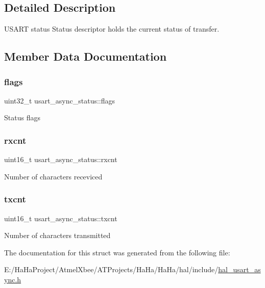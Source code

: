 \subsection{Detailed Description}
U\+S\+A\+RT status Status descriptor holds the current status of transfer. 

\subsection{Member Data Documentation}
\mbox{\label{structusart__async__status_a6d85ac04ed76a86bb9c49bb45a848d9a}} 
\subsubsection{\texorpdfstring{flags}{flags}}
{\footnotesize\ttfamily uint32\+\_\+t usart\+\_\+async\+\_\+status\+::flags}

Status flags \mbox{\label{structusart__async__status_ac32698399322fed11e6914cbd88f5ee5}} 
\subsubsection{\texorpdfstring{rxcnt}{rxcnt}}
{\footnotesize\ttfamily uint16\+\_\+t usart\+\_\+async\+\_\+status\+::rxcnt}

Number of characters receviced \mbox{\label{structusart__async__status_a5680433094528c4ff7bcd49fba77e970}} 
\subsubsection{\texorpdfstring{txcnt}{txcnt}}
{\footnotesize\ttfamily uint16\+\_\+t usart\+\_\+async\+\_\+status\+::txcnt}

Number of characters transmitted 

The documentation for this struct was generated from the following file\+:\begin{DoxyCompactItemize}
\item 
E\+:/\+Ha\+Ha\+Project/\+Atmel\+Xbee/\+A\+T\+Projects/\+Ha\+Ha/\+Ha\+Ha/hal/include/\hyperlink{hal__usart__async_8h}{hal\+\_\+usart\+\_\+async.\+h}\end{DoxyCompactItemize}
